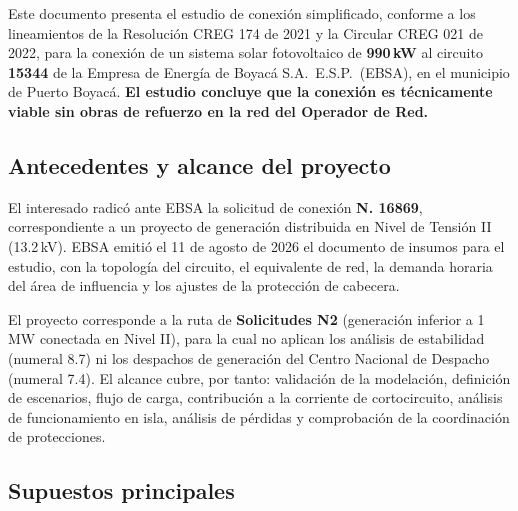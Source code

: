 \documentclass[11pt,a4paper]{article}
\begin{document}
Este documento presenta el estudio de conexi\'on simplificado, conforme a los
lineamientos de la Resoluci\'on CREG 174 de 2021 y la Circular CREG 021 de 2022,
para la conexi\'on de un sistema solar fotovoltaico de \textbf{990\,kW} al
circuito \textbf{15344} de la Empresa de Energ\'ia de Boyac\'a S.A.\ E.S.P.\
(EBSA), en el municipio de Puerto Boyac\'a. \textbf{El estudio concluye que la
conexi\'on es t\'ecnicamente viable sin obras de refuerzo en la red del Operador
de Red.}

\subsection*{Antecedentes y alcance del proyecto}

El interesado radic\'o ante EBSA la solicitud de conexi\'on \textbf{N.\textdegree{}
16869}, correspondiente a un proyecto de generaci\'on distribuida en Nivel de
Tensi\'on II (13.2\,kV). EBSA emiti\'o el 11 de agosto de 2026 el documento de
insumos para el estudio, con la topolog\'ia del circuito, el equivalente de red,
la demanda horaria del \'area de influencia y los ajustes de la protecci\'on de
cabecera.

El proyecto corresponde a la ruta de \textbf{Solicitudes N2} (generaci\'on
inferior a 1\,MW conectada en Nivel II), para la cual no aplican los an\'alisis
de estabilidad (numeral 8.7) ni los despachos de generaci\'on del Centro Nacional
de Despacho (numeral 7.4). El alcance cubre, por tanto: validaci\'on de la
modelaci\'on, definici\'on de escenarios, flujo de carga, contribuci\'on a la
corriente de cortocircuito, an\'alisis de funcionamiento en isla, an\'alisis de
p\'erdidas y comprobaci\'on de la coordinaci\'on de protecciones.

\subsection*{Supuestos principales}
\end{document}
